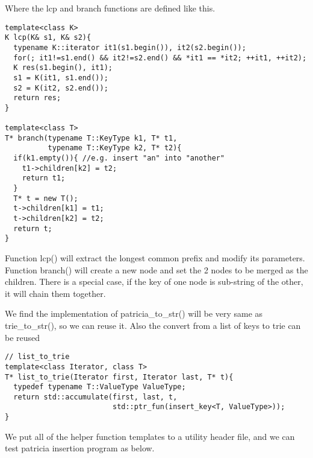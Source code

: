 \documentclass{article}
\begin{document}
Where the lcp and branch functions are defined like this.

\begin{lstlisting}
template<class K>
K lcp(K& s1, K& s2){
  typename K::iterator it1(s1.begin()), it2(s2.begin());
  for(; it1!=s1.end() && it2!=s2.end() && *it1 == *it2; ++it1, ++it2);
  K res(s1.begin(), it1);
  s1 = K(it1, s1.end());
  s2 = K(it2, s2.end());
  return res;
}

template<class T>
T* branch(typename T::KeyType k1, T* t1,
          typename T::KeyType k2, T* t2){
  if(k1.empty()){ //e.g. insert "an" into "another"
    t1->children[k2] = t2;
    return t1;
  }
  T* t = new T();
  t->children[k1] = t1;
  t->children[k2] = t2;
  return t;
}
\end{lstlisting}

Function lcp() will extract the longest common prefix and modify its
parameters. Function branch() will create a new node and set the 2
nodes to be merged as the children. There is a special case, if the
key of one node is sub-string of the other, it will chain them
together.

We find the implementation of patricia\_to\_str() will be very same
as trie\_to\_str(), so we can reuse it. Also the convert from a list
of keys to trie can be reused

\begin{lstlisting}
// list_to_trie
template<class Iterator, class T>
T* list_to_trie(Iterator first, Iterator last, T* t){
  typedef typename T::ValueType ValueType;
  return std::accumulate(first, last, t,
                         std::ptr_fun(insert_key<T, ValueType>));
}
\end{lstlisting}

We put all of the helper function templates to a utility header file,
and we can test patricia insertion program as below.
\end{document}
